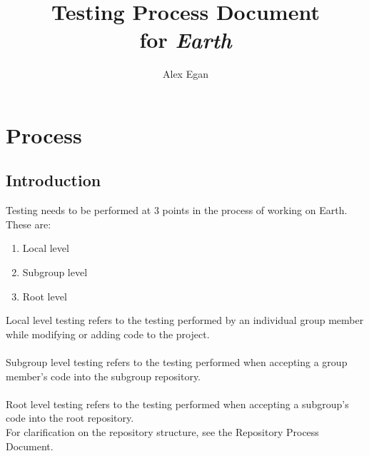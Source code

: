 \documentclass{article}
\begin{document}
\title{\textbf{Testing Process Document}\\for \textit{Earth}}
\author{Alex Egan}
\date{ }
\maketitle
{}
\thispagestyle{empty}

\newpage

\thispagestyle{empty}
\tableofcontents

\newpage


\setcounter{page}{1}
\section{Process}

\subsection{Introduction}
Testing needs to be performed at 3 points in the process of working on Earth. These are:
\begin{enumerate}
	\item Local level
	\item Subgroup level
	\item Root level
\end{enumerate}
Local level testing refers to the testing performed by an individual group member while modifying or adding code to the project.\\
\\
Subgroup level testing refers to the testing performed when accepting a group member's code into the subgroup repository.\\
\\
Root level testing refers to the testing performed when accepting a subgroup's code into the root repository.
\\
For clarification on the repository structure, see the Repository Process Document.
\end{document}
